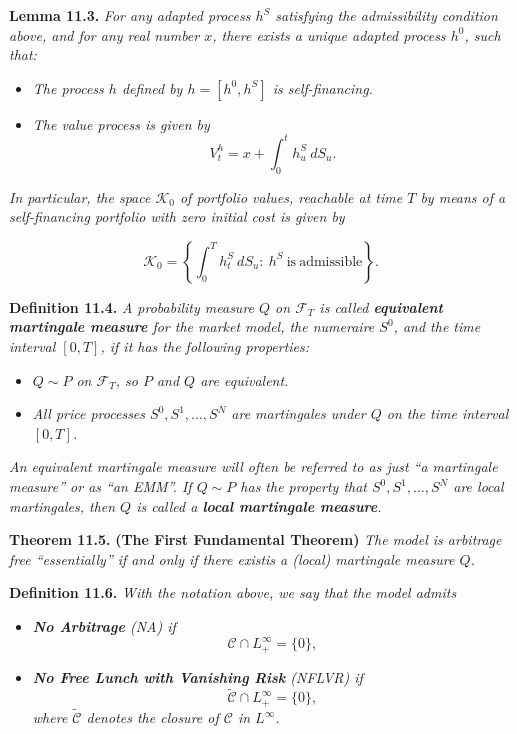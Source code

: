 \documentclass[
]{article}
\providecommand{\tightlist}{%
  \setlength{\itemsep}{0pt}\setlength{\parskip}{0pt}}
\begin{document}
\textbf{Lemma 11.3.} \emph{For any adapted process \(h^S\) satisfying
the admissibility condition above, and for any real number \(x\), there
exists a unique adapted process \(h^0\), such that:}

\begin{itemize}
\tightlist
\item
  \emph{The process \(h\) defined by \(h=[h^0,h^S]\) is self-financing.}
\item
  \emph{The value process is given by} \[
    V_t^h=x+\int_0^th_u^S\ dS_u.\tag{11.8}
    \]
\end{itemize}

\emph{In particular, the space \(\mathcal{K}_0\) of portfolio values,
reachable at time \(T\) by means of a self-financing portfolio with zero
initial cost is given by}

\[
\mathcal{K}_0=\left\{\int_0^Th_t^S\ dS_u :\ h^S\ \text{is}\ \text{admissible}\right\}.\tag{11.9}
\]

\textbf{Definition 11.4.} \emph{A probability measure \(Q\) on
\(\mathcal{F}_T\) is called \textbf{equivalent martingale measure} for
the market model, the numeraire \(S^0\), and the time interval
\([0,T]\), if it has the following properties:}

\begin{itemize}
\tightlist
\item
  \emph{\(Q\sim P\) on \(\mathcal{F}_T\), so \(P\) and \(Q\) are
  equivalent.}
\item
  \emph{All price processes \(S^0,S^1,...,S^N\) are martingales under
  \(Q\) on the time interval \([0,T]\).}
\end{itemize}

\emph{An equivalent martingale measure will often be referred to as just
``a martingale measure'' or as ``an EMM''. If \(Q\sim P\) has the
property that \(S^0,S^1,...,S^N\) are local martingales, then \(Q\) is
called a \textbf{local martingale measure}.}

\textbf{Theorem 11.5.} \textbf{(The First Fundamental Theorem)}
\emph{The model is arbitrage free ``essentially'' if and only if there
existis a (local) martingale measure \(Q\).}

\textbf{Definition 11.6.} \emph{With the notation above, we say that the
model admits}

\begin{itemize}
\tightlist
\item
  \emph{\textbf{No Arbitrage} (NA) if} \[
    \mathcal{C}\cap L_+^\infty=\{0\},\tag{11.21}
    \]
\item
  \emph{\textbf{No Free Lunch with Vanishing Risk} (NFLVR) if} \[
    \tilde{\mathcal{C}}\cap L_+^\infty=\{0\},\tag{11.22}
    \] \emph{where \(\tilde{\mathcal{C}}\) denotes the closure of
  \(\mathcal{C}\) in \(L^\infty\).}
\end{itemize}
\end{document}
